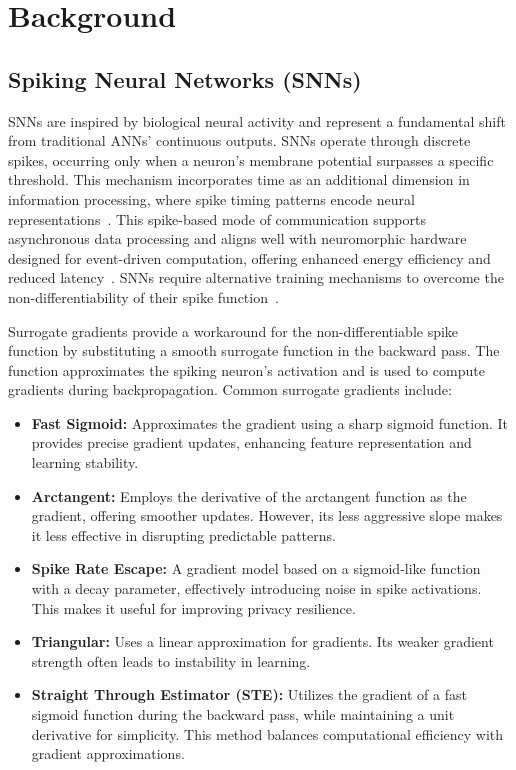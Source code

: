 \section{Background}
\subsection{Spiking Neural Networks (SNNs)}
\noindent
SNNs are inspired by biological neural activity and represent a fundamental shift from traditional ANNs' continuous outputs. SNNs operate through discrete spikes, occurring only when a neuron’s membrane potential surpasses a specific threshold. This mechanism incorporates time as an additional dimension in information processing, where spike timing patterns encode neural representations~\cite{schuman2022opportunities}. This spike-based mode of communication supports asynchronous data processing and aligns well with neuromorphic hardware designed for event-driven computation, offering enhanced energy efficiency and reduced latency~\cite{schuman2022opportunities}. SNNs require alternative training mechanisms to overcome the non-differentiability of their spike function~\cite{schuman2022opportunities}.

Surrogate gradients provide a workaround for the non-differentiable spike function by substituting a smooth surrogate function in the backward pass. The function approximates the spiking neuron’s activation and is used to compute gradients during backpropagation. Common surrogate gradients include:

\begin{itemize}
    \item \textbf{Fast Sigmoid:} Approximates the gradient using a sharp sigmoid function. It provides precise gradient updates, enhancing feature representation and learning stability.
    
    \item \textbf{Arctangent:} Employs the derivative of the arctangent function as the gradient, offering smoother updates. However, its less aggressive slope makes it less effective in disrupting predictable patterns.

    \item \textbf{Spike Rate Escape:} A gradient model based on a sigmoid-like function with a decay parameter, effectively introducing noise in spike activations. This makes it useful for improving privacy resilience.

    \item \textbf{Triangular:} Uses a linear approximation for gradients. Its weaker gradient strength often leads to instability in learning.

    \item \textbf{Straight Through Estimator (STE):} Utilizes the gradient of a fast sigmoid function during the backward pass, while maintaining a unit derivative for simplicity. This method balances computational efficiency with gradient approximations.
\end{itemize}





